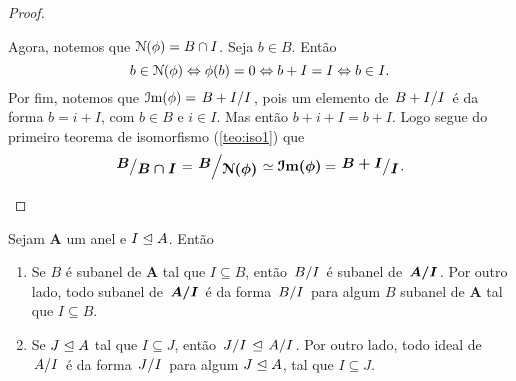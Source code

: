 \begin{proof}
\begin{enumerate}
	Agora, notemos que $\mathcal{N}(\phi)=B \cap I$. Seja $b \in B$. Então
	\begin{equation*}
	b \in \mathcal{N}(\phi) \Leftrightarrow \phi(b)=0 \Leftrightarrow b+I = I \Leftrightarrow b \in I.
	\end{equation*}
	Por fim, notemos que $\im(\phi)=\quo{B+I}{I}$, pois um elemento de $\quo{B+I}{I}$ é da forma $b=i+I$, com $b \in B$ e $i \in I$. Mas então $b+i+I=b+I$. Logo segue do primeiro teorema de isomorfismo (\ref{teo:iso1}) que
	\begin{equation*}
	\bm{\quo{B}{B \cap I}} = \bm{\quo{B}{\nuc(\phi)}} \simeq \bm{\im(\phi)} =\bm{\quo{B+I}{I}}.
	\end{equation*}
	\end{enumerate}
\end{proof}

\begin{lema}
	Sejam $\bm A$ um anel e $I \mathrel{\unlhd} A$. Então
	\begin{enumerate}
	\item Se $B$ é subanel de $\bm A$ tal que $I \subseteq B$, então $\quo{B}{I}$ é subanel de $\bm{\quo{A}{I}}$. Por outro lado, todo subanel de $\bm{\quo{A}{I}}$ é da forma $\quo{B}{I}$ para algum $B$ subanel de $\bm A$ tal que $I \subseteq B$.
	\item Se $J \mathrel{\unlhd} A$ tal que $I \subseteq J$, então $\quo{J}{I} \ide \quo{A}{I}$. Por outro lado, todo ideal de $\quo{A}{I}$ é da forma $\quo{J}{I}$ para algum $J \mathrel{\unlhd} A$, tal que $I \subseteq J$.
	\end{enumerate}
\end{lema}
